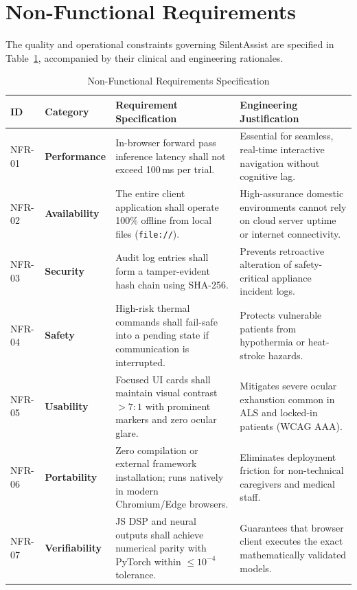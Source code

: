 \documentclass[12pt,a4paper]{report}
\begin{document}
\section{Non-Functional Requirements}
The quality and operational constraints governing SilentAssist are specified in Table~\ref{tab:nfr}, accompanied by their clinical and engineering rationales.

\begin{table}[H]
\centering
\small
\caption{Non-Functional Requirements Specification}
\label{tab:nfr}
\begin{tabularx}{\textwidth}{p{1.4cm} p{2.6cm} p{4.6cm} X}
\toprule
\textbf{ID} & \textbf{Category} & \textbf{Requirement Specification} & \textbf{Engineering Justification} \\
\midrule
NFR-01 & \textbf{Performance} & In-browser forward pass inference latency shall not exceed 100\,ms per trial. & Essential for seamless, real-time interactive navigation without cognitive lag. \\
\addlinespace
NFR-02 & \textbf{Availability} & The entire client application shall operate 100\% offline from local files (\texttt{file://}). & High-assurance domestic environments cannot rely on cloud server uptime or internet connectivity. \\
\addlinespace
NFR-03 & \textbf{Security} & Audit log entries shall form a tamper-evident hash chain using SHA-256. & Prevents retroactive alteration of safety-critical appliance incident logs. \\
\addlinespace
NFR-04 & \textbf{Safety} & High-risk thermal commands shall fail-safe into a pending state if communication is interrupted. & Protects vulnerable patients from hypothermia or heat-stroke hazards. \\
\addlinespace
NFR-05 & \textbf{Usability} & Focused UI cards shall maintain visual contrast $> 7:1$ with prominent markers and zero ocular glare. & Mitigates severe ocular exhaustion common in ALS and locked-in patients (WCAG AAA). \\
\addlinespace
NFR-06 & \textbf{Portability} & Zero compilation or external framework installation; runs natively in modern Chromium/Edge browsers. & Eliminates deployment friction for non-technical caregivers and medical staff. \\
\addlinespace
NFR-07 & \textbf{Verifiability} & JS DSP and neural outputs shall achieve numerical parity with PyTorch within $\le 10^{-4}$ tolerance. & Guarantees that browser client executes the exact mathematically validated models. \\
\bottomrule
\end{tabularx}
\end{table}
\end{document}
